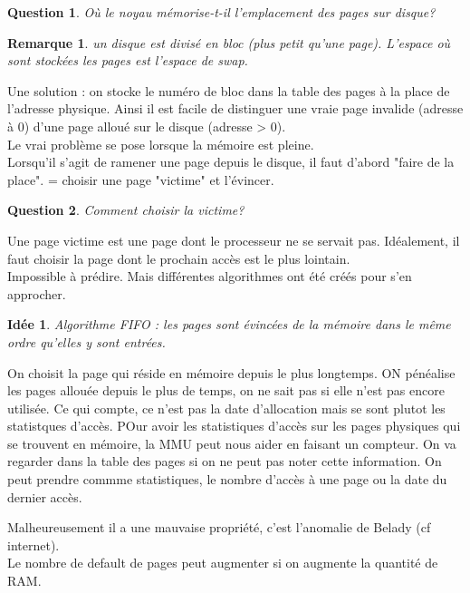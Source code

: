 \documentclass[12pt,a4paper]{report}
\newtheorem*{rem}{Remarque}
\newtheorem*{q}{Question}
\newtheorem*{id}{Idée}
\begin{document}
\begin{q}Où le noyau mémorise-t-il l'emplacement des pages sur disque?\end{q}
\begin{rem}un disque est divisé en bloc (plus petit qu'une page). L'espace où sont stockées les pages est l'espace de swap.\end{rem}

Une solution : on stocke le numéro de bloc dans la table des pages à la place de l'adresse physique. Ainsi il est facile de distinguer une vraie page invalide (adresse à 0) d'une page alloué sur le disque (adresse  > 0).\\

Le vrai problème se pose lorsque la mémoire est pleine.\\
Lorsqu'il s'agit de ramener une page depuis le disque, il faut d'abord "faire de la place". = choisir une page "victime" et l'évincer.\\

\begin{q}Comment choisir la victime?\end{q}
Une page victime est une page dont le processeur ne se servait pas.
Idéalement, il faut choisir la page dont le prochain accès est le plus lointain. \\
Impossible à prédire. Mais différentes algorithmes ont été créés pour s'en approcher.\\

\begin{id}
Algorithme FIFO : les pages sont évincées de la mémoire dans le même ordre qu'elles y sont entrées.\end{id}
On choisit la page qui réside en mémoire depuis le plus longtemps. ON pénéalise les pages allouée depuis le plus de temps, on ne sait pas si elle n'est pas encore utilisée.
Ce qui compte, ce n'est pas la date d'allocation mais se sont plutot les statistques d'accès. POur avoir les statistiques d'accès sur les pages physiques qui se trouvent en mémoire, la MMU peut nous aider en faisant un compteur. On va regarder dans la table des pages si on ne peut pas noter cette information.
On peut prendre commme statistiques, le nombre d'accès à une page ou la date du dernier accès.

Malheureusement il a une mauvaise propriété, c'est l'anomalie de Belady (cf internet).\\
Le nombre de default de pages peut augmenter si on augmente la quantité de RAM.\\
\end{document}
